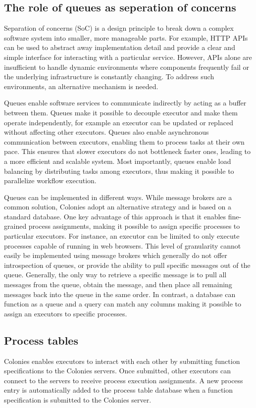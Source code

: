 \documentclass{article}
\begin{document}
\subsection{The role of queues as seperation of concerns}
Separation of concerns (SoC) is a design principle to break down a complex software system into smaller, more manageable parts. For example, HTTP APIs can be used to abstract away implementation detail and provide a clear and simple interface for interacting with a particular service. However, APIs alone are insufficient to handle dynamic environments where components frequently fail or the underlying infrastructure is constantly changing. To address such environments, an alternative mechanism is needed. 

Queues enable software services to communicate indirectly by acting as a buffer between them. Queues make it possible to decouple executor and make them operate independently, for example an executor can be updated or replaced without affecting other executors. Queues also enable asynchronous communication between executors, enabling them to process tasks at their own pace. This ensures that slower executors do not bottleneck faster ones, leading to a more efficient and scalable system. Most importantly, queues enable load balancing by distributing tasks among executors, thus making it possible to parallelize workflow execution. 

Queues can be implemented in different ways. While message brokers are a common solution, Colonies adopt an alternative strategy and is based on a standard database. One key advantage of this approach is that it enables fine-grained process assignments, making it possible to assign specific processes to particular executors. For instance, an executor can be limited to only execute processes capable of running in web browsers. This level of granularity cannot easily be implemented using message brokers which generally do not offer introspection of queues, or provide the ability to pull specific messages out of the queue. Generally, the only way to retrieve a specific message is to pull all messages from the queue, obtain the message, and then place all remaining messages back into the queue in the same order. In contrast, a database can function as a queue and a query can match any columns making it possible to assign an executors to specific processes.

\subsection{Process tables}
Colonies enables executors to interact with each other by submitting function specifications to the Colonies servers. Once submitted, other executors can connect to the servers to receive process execution assignments. A new process entry is automatically added to the process table database when a function specification is submitted to the Colonies server.
\end{document}
